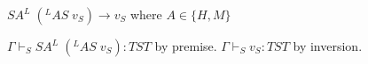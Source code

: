 \begin{case}
$SA^{L}\;(^{L}AS\;v_{S})\rightarrow v_{S}$ where $A\in\lbrace H,M\rbrace$

$\Gamma\vdash_{S}SA^{L}\;(^{L}AS\;v_{S}):TST$ by premise.  $\Gamma\vdash_{S}v_{S}:TST$ by inversion.
\end{case}